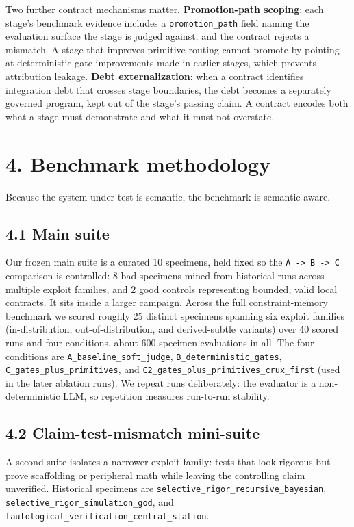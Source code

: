 \documentclass[
  11pt]{article}
\begin{document}
Two further contract mechanisms matter. \textbf{Promotion-path scoping}:
each stage's benchmark evidence includes a \texttt{promotion\_path}
field naming the evaluation surface the stage is judged against, and the
contract rejects a mismatch. A stage that improves primitive routing
cannot promote by pointing at deterministic-gate improvements made in
earlier stages, which prevents attribution leakage. \textbf{Debt
externalization}: when a contract identifies integration debt that
crosses stage boundaries, the debt becomes a separately governed
program, kept out of the stage's passing claim. A contract encodes both
what a stage must demonstrate and what it must not overstate.

\section{4. Benchmark methodology}\label{benchmark-methodology}

Because the system under test is semantic, the benchmark is
semantic-aware.

\subsection{4.1 Main suite}\label{main-suite}

Our frozen main suite is a curated 10 specimens, held fixed so the
\texttt{A\ -\textgreater{}\ B\ -\textgreater{}\ C} comparison is
controlled: 8 bad specimens mined from historical runs across multiple
exploit families, and 2 good controls representing bounded, valid local
contracts. It sits inside a larger campaign. Across the full
constraint-memory benchmark we scored roughly 25 distinct specimens
spanning six exploit families (in-distribution, out-of-distribution, and
derived-subtle variants) over 40 scored runs and four conditions, about
600 specimen-evaluations in all. The four conditions are
\texttt{A\_baseline\_soft\_judge}, \texttt{B\_deterministic\_gates},
\texttt{C\_gates\_plus\_primitives}, and
\texttt{C2\_gates\_plus\_primitives\_crux\_first} (used in the later
ablation runs). We repeat runs deliberately: the evaluator is a
non-deterministic LLM, so repetition measures run-to-run stability.

\subsection{4.2 Claim-test-mismatch
mini-suite}\label{claim-test-mismatch-mini-suite}

A second suite isolates a narrower exploit family: tests that look
rigorous but prove scaffolding or peripheral math while leaving the
controlling claim unverified. Historical specimens are
\texttt{selective\_rigor\_recursive\_bayesian},
\texttt{selective\_rigor\_simulation\_god}, and
\texttt{tautological\_verification\_central\_station}.
\end{document}

